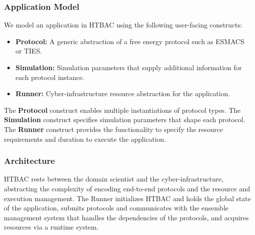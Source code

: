 \subsubsection{Application Model}

We model an application in HTBAC using the following user-facing 
constructs:

\begin{itemize}
  \item \textbf{Protocol:} A generic abstraction of a free energy protocol
  such as ESMACS or TIES.
  \item \textbf{Simulation:} Simulation parameters that supply additional
  information for each protocol instance.
  \item \textbf{Runner:} Cyber-infrastructure resource abstraction for the
  application.
\end{itemize}

The \textbf{Protocol} construct  enables multiple instantiations of protocol types. 
The \textbf{Simulation} construct  specifies simulation parameters that shape 
each protocol. The \textbf{Runner} construct provides the functionality to 
specify the resource requirements and duration to execute the application.

\subsubsection{Architecture}

HTBAC rests between the domain scientist and the cyber-infrastructure, 
abstracting the complexity of encoding end-to-end protocols and the resource and 
execution management. The Runner initializes HTBAC and holds the global state of 
the application, submits protocols and communicates with the ensemble management 
system that handles the dependencies of the protocols, and acquires resources 
via a runtime system. 






